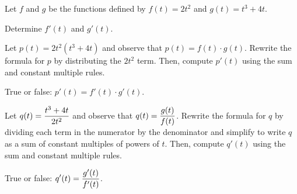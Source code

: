 \begin{pa} \label{PA:2.5}
Let $f$ and $g$ be the functions defined by $f(t) = 2t^2$ and $g(t) = t^3 + 4t$.
\ba
	\item Determine $f'(t)$ and $g'(t)$.
	\item Let $p(t) = 2t^2 (t^3 + 4t)$ and observe that $p(t) = f(t) \cdot g(t)$.  Rewrite the formula for $p$ by distributing the $2t^2$ term.  Then, compute $p'(t)$ using the sum and constant multiple rules.
	\item True or false: $p'(t) = f'(t) \cdot g'(t)$.  
	\item Let $\displaystyle q(t) = \frac{t^3 + 4t}{2t^2}$ and observe that $\displaystyle q(t) = \frac{g(t)}{f(t)}$.  Rewrite the formula for $q$ by dividing each term in the numerator by the denominator and simplify to write $q$ as a sum of constant multiples of powers of $t$.  Then, compute $q'(t)$ using the sum and constant multiple rules.
	\item True or false: $\displaystyle q'(t) = \frac{g'(t)}{f'(t)}$.  
\ea

\end{pa} \afterpa